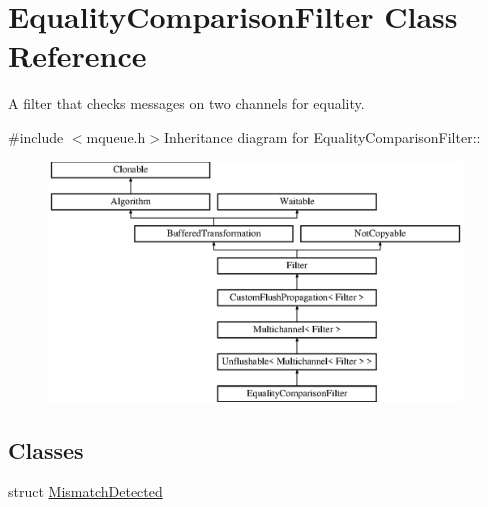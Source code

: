 \hypertarget{class_equality_comparison_filter}{
\section{EqualityComparisonFilter Class Reference}
\label{class_equality_comparison_filter}
}


A filter that checks messages on two channels for equality.  


{\ttfamily \#include $<$mqueue.h$>$}Inheritance diagram for EqualityComparisonFilter::\begin{figure}[H]
\begin{center}
\leavevmode
\includegraphics[height=6.35461cm]{class_equality_comparison_filter}
\end{center}
\end{figure}
\subsection*{Classes}
\begin{DoxyCompactItemize}
\item 
struct \hyperlink{struct_equality_comparison_filter_1_1_mismatch_detected}{MismatchDetected}
\end{DoxyCompactItemize}
